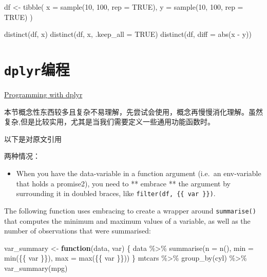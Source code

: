\documentclass[
]{book}
\newenvironment{Shaded}{\begin{snugshade}}{\end{snugshade}}
\newcommand{\AttributeTok}[1]{\textcolor[rgb]{0.77,0.63,0.00}{#1}}
\newcommand{\ConstantTok}[1]{\textcolor[rgb]{0.00,0.00,0.00}{#1}}
\newcommand{\ControlFlowTok}[1]{\textcolor[rgb]{0.13,0.29,0.53}{\textbf{#1}}}
\newcommand{\DecValTok}[1]{\textcolor[rgb]{0.00,0.00,0.81}{#1}}
\newcommand{\FunctionTok}[1]{\textcolor[rgb]{0.00,0.00,0.00}{#1}}
\newcommand{\NormalTok}[1]{#1}
\newcommand{\OtherTok}[1]{\textcolor[rgb]{0.56,0.35,0.01}{#1}}
\newcommand{\SpecialCharTok}[1]{\textcolor[rgb]{0.00,0.00,0.00}{#1}}
\providecommand{\tightlist}{%
  \setlength{\itemsep}{0pt}\setlength{\parskip}{0pt}}
\begin{document}
\begin{Shaded}
\begin{Highlighting}[]
\NormalTok{df }\OtherTok{\textless{}{-}} \FunctionTok{tibble}\NormalTok{(}
  \AttributeTok{x =} \FunctionTok{sample}\NormalTok{(}\DecValTok{10}\NormalTok{, }\DecValTok{100}\NormalTok{, }\AttributeTok{rep =} \ConstantTok{TRUE}\NormalTok{),}
  \AttributeTok{y =} \FunctionTok{sample}\NormalTok{(}\DecValTok{10}\NormalTok{, }\DecValTok{100}\NormalTok{, }\AttributeTok{rep =} \ConstantTok{TRUE}\NormalTok{)}
\NormalTok{)}

\FunctionTok{distinct}\NormalTok{(df, x)}
\FunctionTok{distinct}\NormalTok{(df, x, }\AttributeTok{.keep\_all =} \ConstantTok{TRUE}\NormalTok{)}
\FunctionTok{distinct}\NormalTok{(df, }\AttributeTok{diff =} \FunctionTok{abs}\NormalTok{(x }\SpecialCharTok{{-}}\NormalTok{ y))}
\end{Highlighting}
\end{Shaded}

\hypertarget{dplyr-programming}{%
\section{\texorpdfstring{\texttt{dplyr}编程}{dplyr编程}}\label{dplyr-programming}}

\href{https://cloud.r-project.org/web/packages/dplyr/vignettes/programming.html}{Programming with dplyr}

本节概念性东西较多且复杂不易理解，先尝试会使用，概念再慢慢消化理解。虽然复杂,但是比较实用，尤其是当我们需要定义一些通用功能函数时。

以下是对原文引用

两种情况：

\begin{itemize}
\tightlist
\item
  When you have the data-variable in a function argument (i.e.~an env-variable that holds a promise2), you need to ** embrace ** the argument by surrounding it in doubled braces, like \texttt{filter(df,\ \{\{\ var\ \}\})}.
\end{itemize}

The following function uses embracing to create a wrapper around \texttt{summarise()} that computes the minimum and maximum values of a variable, as well as the number of observations that were summarised:

\begin{Shaded}
\begin{Highlighting}[]
\NormalTok{var\_summary }\OtherTok{\textless{}{-}} \ControlFlowTok{function}\NormalTok{(data, var) \{}
\NormalTok{  data }\SpecialCharTok{\%\textgreater{}\%}
    \FunctionTok{summarise}\NormalTok{(}\AttributeTok{n =} \FunctionTok{n}\NormalTok{(), }\AttributeTok{min =} \FunctionTok{min}\NormalTok{(\{\{ var \}\}), }\AttributeTok{max =} \FunctionTok{max}\NormalTok{(\{\{ var \}\}))}
\NormalTok{\}}
\NormalTok{mtcars }\SpecialCharTok{\%\textgreater{}\%} 
  \FunctionTok{group\_by}\NormalTok{(cyl) }\SpecialCharTok{\%\textgreater{}\%} 
  \FunctionTok{var\_summary}\NormalTok{(mpg)}
\end{Highlighting}
\end{Shaded}
\end{document}
